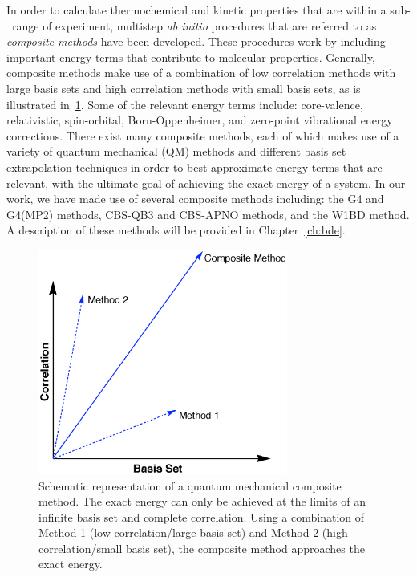 In order to calculate thermochemical and kinetic properties that are within a
sub-\kcalmol\ range of experiment, multistep \emph{ab initio} procedures that
are referred to as \emph{composite methods} have been
developed.\cite{Karton2016} These procedures work by including important energy
terms that contribute to molecular properties. Generally, composite methods
make use of a combination of low correlation methods with large basis sets and
high correlation methods with small basis sets, as is illustrated
in~\ref{fig:comp}. Some of the relevant energy terms include: core-valence,
relativistic, spin-orbital, Born-Oppenheimer, and zero-point vibrational energy
corrections. There exist many composite methods, each of which makes use of a
variety of quantum mechanical (QM) methods and different basis set
extrapolation techniques in order to best approximate energy terms that are
relevant, with the ultimate goal of achieving the exact energy of a system. In
our work, we have made use of several composite methods including: the G4 and
G4(MP2) methods,\cite{Curtiss2007,Curtiss2007a} CBS-QB3 and CBS-APNO
methods,\cite{Montgomery1999,Montgomery2000,Ochterski1996} and the W1BD
method.\cite{Barnes2009} A description of these methods will be provided in
Chapter~\ref{ch:bde}.

\begin{figure}[htb]
  \centering
  \includegraphics[height=20em]{figures/compositemethods.eps}
  \caption[Schematic representation of a quantum mechanical composite
  method.]{Schematic representation of a quantum mechanical composite method.
  The exact energy can only be achieved at the limits of an infinite basis set
  and complete correlation. Using a combination of Method 1 (low
  correlation/large basis set) and Method 2 (high correlation/small basis set),
  the composite method approaches the exact energy.} \label{fig:comp}
\end{figure}

